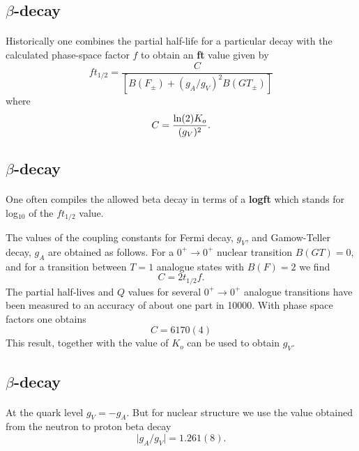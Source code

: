 \documentclass[%
twoside,                 %
final,                   %
10pt]{article}
\begin{document}
\subsection*{$\beta$-decay}

\paragraph{}
Historically
one combines the partial half-life for a particular decay
with the calculated
phase-space factor $f$ to obtain  an \textbf{ft} value given by
\[
  f t_{1/2}=\frac{C }{\left[B(F_{\pm})+(g_{A}/g_{V})^{2} B(GT_{\pm}) \right] }  
\]
where
\[
  C = \frac{{\rm ln}(2)K_{o}}{(g_{V})^{2}}. 
\]



\subsection*{$\beta$-decay}

\paragraph{}
One often compiles the allowed beta decay in terms of a \textbf{logft}
which stands for log$_{10}$ of the $ft_{1/2}$ value.

     The values of the coupling constants for Fermi decay,
$g_{V}$, and Gamow-Teller decay, $g_{A}$ are obtained as follows.
For a $0^{+} \rightarrow  0^{+}$ nuclear transition $B(GT)=0$, and for a
transition between $  T=1  $ analogue states with $B(F)=2$ we find 
\[
       C = 2 t_{1/2} f.  
\]
The partial half-lives and $Q$ values for several $0^{+} \rightarrow  0^{+}$ analogue
transitions have been measured to an accuracy of about one part in
10000. With  phase space factors one obtains 
\[
      C = 6170(4)    
\]
This result, together with the value of $K_{o}$ can be used to obtain $g_{V}$.



\subsection*{$\beta$-decay}

\paragraph{}
At the quark level $g_{V}=-g_{A}$.
But for nuclear structure we use the value obtained from the
neutron to proton beta decay
\[
     \vert g_{A}/g_{V}\vert  = 1.261(8). 
\]
\end{document}
